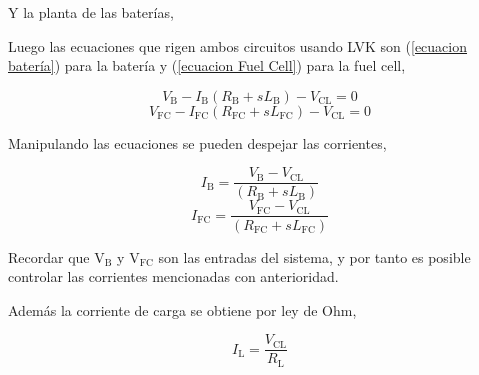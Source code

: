 Y la planta de las baterías,

\begin{center}
\end{center}

Luego las ecuaciones que rigen ambos circuitos usando LVK son (\ref{ecuacion batería}) para la batería y (\ref{ecuacion Fuel Cell}) para la fuel cell,

\begin{equation}\label{ecuacion batería}
    V_{\text{B}} - I_{\text{B}}(R_{\text{B}} + sL_{\text{B}}) - V_{\text{CL}} = 0
\end{equation}
\begin{equation}\label{ecuacion Fuel Cell}
    V_{\text{FC}} - I_{\text{FC}}(R_{\text{FC}} + sL_{\text{FC}}) - V_{\text{CL}} = 0
\end{equation}

Manipulando las ecuaciones se pueden despejar las corrientes,

\begin{equation}
    I_{\text{B}} = \frac{V_{\text{B}}- V_{\text{CL}}}{(R_{\text{B}} + sL_{\text{B}})} 
\end{equation}
\begin{equation}
    I_{\text{FC}} = \frac{V_{\text{FC}}- V_{\text{CL}}}{(R_{\text{FC}} + sL_{\text{FC}})} 
\end{equation}

Recordar que V$_{\text{B}}$ y V$_{\text{FC}}$ son las entradas del sistema, y por tanto es posible controlar las corrientes mencionadas con anterioridad.

Además la corriente de carga se obtiene por ley de Ohm,

\begin{equation}
    I_{\text{L}} = \frac{V_{\text{CL}}}{R_{\text{L}}}
\end{equation}

